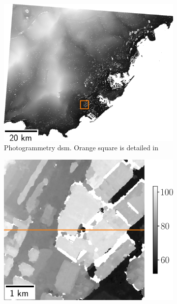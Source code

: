 \begin{figure}
    \begin{subfigure}[t]{0.3\linewidth}
        \flushleft
        \includegraphics[width=\linewidth]{Images/Chap_6/Monaco_dsm_full_6000-6500_4800-5300.png}
        \caption{Photogrammetry \acrshort{dsm}. Orange square is detailed in }
        \label{fig:monaco_dsm_full}
    \end{subfigure}\hfill
    \begin{subfigure}[t]{0.3\linewidth}
        \centering
        \includegraphics[width=\linewidth]{Images/Chap_6/Monaco_dsm_zoom_6000-6500_4800-5300.png}

\end{subfigure}
\end{figure}

